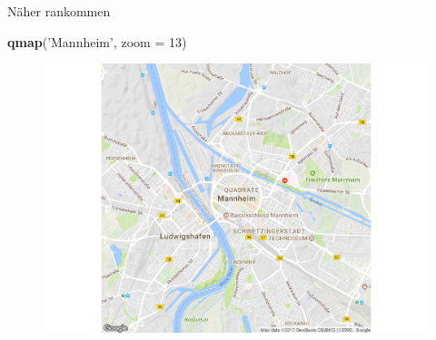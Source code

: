 \documentclass[ignorenonframetext,]{beamer}
\newenvironment{Shaded}{}{}
\newcommand{\KeywordTok}[1]{\textcolor[rgb]{0.00,0.44,0.13}{\textbf{{#1}}}}
\newcommand{\DataTypeTok}[1]{\textcolor[rgb]{0.56,0.13,0.00}{{#1}}}
\newcommand{\DecValTok}[1]{\textcolor[rgb]{0.25,0.63,0.44}{{#1}}}
\newcommand{\StringTok}[1]{\textcolor[rgb]{0.25,0.44,0.63}{{#1}}}
\newcommand{\NormalTok}[1]{{#1}}
\begin{document}
\begin{frame}[fragile]{Näher rankommen}

\begin{Shaded}
\begin{Highlighting}[]
\KeywordTok{qmap}\NormalTok{(}\StringTok{'Mannheim'}\NormalTok{, }\DataTypeTok{zoom =} \DecValTok{13}\NormalTok{)}
\end{Highlighting}
\end{Shaded}

\begin{figure}[htbp]
\centering
\includegraphics{RSocialScience2_files/figure-beamer/unnamed-chunk-35-1.pdf}
\caption{}
\end{figure}

\end{frame}
\end{document}
